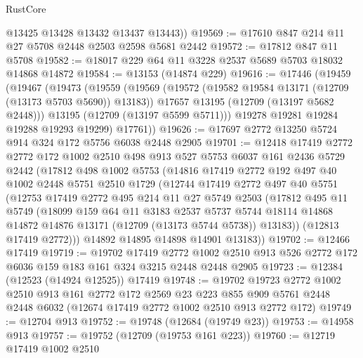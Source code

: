 \begin{lexlean}{RustCore}
\begin{coremodule}
        @13425
        @13428
        @13432
        @13437
        @13443))
@19569 := @17610 @847 @214 @11 @27 @5708 @2448 @2503 @2598 @5681 @2442
@19572 := @17812 @847 @11 @5708
@19582 := @18017 @229 @64 @11 @3228 @2537 @5689 @5703 @18032 @14868 @14872
@19584 := @13153 (@14874 @229)
@19616 := @17446
    (@19459
      (@19467
        (@19473
          (@19559
            (@19569
              (@19572 (@19582 @19584 @13171 (@12709 (@13173 @5703 @5690)) @13183))
              @17657
              @13195
              (@12709 (@13197 @5682 @2448)))
            @13195
            (@12709 (@13197 @5599 @5711)))
          @19278
          @19281
          @19284
          @19288
          @19293
          @19299)
        @17761))
@19626 := @17697 @2772 @13250 @5724 @914 @324 @172 @5756 @6038 @2448 @2905
@19701 := @12418
    @17419
    @2772
    @2772
    @172
    @1002
    @2510
    @498
    @913
    @527
    @5753
    @6037
    @161
    @2436
    @5729
    @2442
    (@17812
      @498
      @1002
      @5753
      (@14816
        @17419
        @2772
        @192
        @497
        @40
        @1002
        @2448
        @5751
        @2510
        @1729
        (@12744
          @17419
          @2772
          @497
          @40
          @5751
          (@12753
            @17419
            @2772
            @495
            @214
            @11
            @27
            @5749
            @2503
            (@17812
              @495
              @11
              @5749
              (@18099
                @159
                @64
                @11
                @3183
                @2537
                @5737
                @5744
                @18114
                @14868
                @14872
                @14876
                @13171
                (@12709 (@13173 @5744 @5738))
                @13183))
            (@12813 @17419 @2772)))
        @14892
        @14895
        @14898
        @14901
        @13183))
@19702 := @12466 @17419
@19719 := @19702
    @17419
    @2772
    @1002
    @2510
    @913
    @526
    @2772
    @172
    @6036
    @159
    @183
    @161
    @324
    @3215
    @2448
    @2448
    @2905
@19723 := @12384 (@12523 (@14924 @12525)) @17419
@19748 := @19702
    @19723
    @2772
    @1002
    @2510
    @913
    @161
    @2772
    @172
    @2569
    @23
    @223
    @855
    @909
    @5761
    @2448
    @2448
    @6032
    (@12674 @17419 @2772 @1002 @2510 @913 @2772 @172)
@19749 := @12704 @913
@19752 := @19748 (@12684 (@19749 @23))
@19753 := @14958 @913
@19757 := @19752 (@12709 (@19753 @161 @223))
@19760 := @12719 @17419 @1002 @2510

\end{coremodule}
\end{lexlean}
